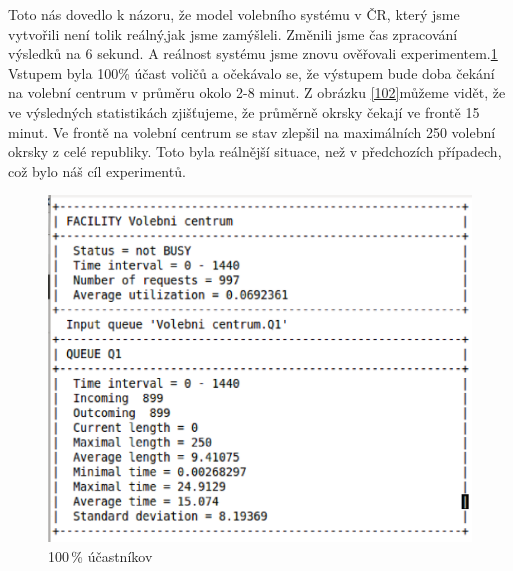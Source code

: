 \documentclass[12pt,a4paper,titlepage,final]{article}
\begin{document}
\newpage
Toto nás dovedlo k názoru, že model volebního systému v ČR, který jsme vytvořili není tolik reálný,jak jsme zamýšleli. Změnili jsme čas zpracování výsledků na 6 sekund. A reálnost systému jsme znovu ověřovali experimentem.\ref{100}\newline
Vstupem byla 100\% účast voličů a očekávalo se, že výstupem bude doba čekání na volební centrum v průměru okolo 2-8 minut. Z obrázku \ref{102}můžeme vidět, že ve výsledných statistikách zjišťujeme, že průměrně okrsky čekají ve frontě 15 minut. Ve frontě na volební centrum se stav zlepšil na maximálních 250 volební okrsky z celé republiky. Toto byla reálnější situace, než v předchozích případech, což bylo náš cíl experimentů.
\newline
\newline
\begin{figure}[h]

\begin{center}

\includegraphics[scale=0.6]{img/100.eps} 
\caption{100\,\% účastníkov}
\label{100}

\end{center}

\end{figure}
\end{document}
